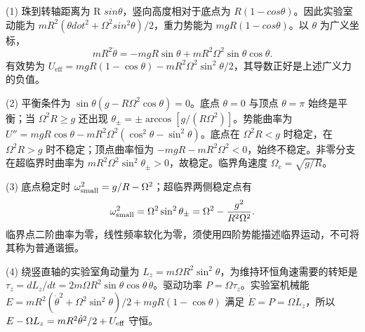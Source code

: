 (1) 珠到转轴距离为 R \(sin\theta \)，竖向高度相对于底点为 \(R(1-cos\theta )\)。因此实验室动能为 \(mR^{2}(\theta dot^{2}+\Omega ^{2}sin^{2}\theta )/2\)，重力势能为 \(mgR(1-cos\theta )\)。以 \(\theta \) 为广义坐标，
\[
mR^2\ddot\theta=-mgR\sin\theta+mR^2\Omega^2\sin\theta\cos\theta .
\]
有效势为 \(U_{\mathrm{eff}}=mgR(1-\cos\theta)-mR^2\Omega^2\sin^2\theta/2\)，其导数正好是上述广义力的负值。

(2) 平衡条件为 \(\sin\theta(g-R\Omega^2\cos\theta)=0\)。底点 \(\theta =0\) 与顶点 \(\theta =\pi \) 始终是平衡；当 \(\Omega^2R\ge g\) 还出现 \(\theta_\pm=\pm\arccos[g/(R\Omega^2)]\)。势能曲率为 \(U''=mgR\cos\theta-mR^2\Omega^2(\cos^2\theta-\sin^2\theta)\)。底点在 \(\Omega ^{2}R<g\) 时稳定，在 \(\Omega ^{2}R>g\) 时不稳定；顶点曲率恒为 \(-mgR-mR^2\Omega^2<0\)，始终不稳定。非零分支在超临界时曲率为 \(mR^2\Omega^2\sin^2\theta_\pm>0\)，故稳定。临界角速度 \(\Omega_c=\sqrt{g/R}\)。

(3) 底点稳定时 \(\omega_{\rm small}^2=g/R-\Omega^2\)；超临界两侧稳定点有
\[
\omega_{\rm small}^2=\Omega^2\sin^2\theta_\pm
=\Omega^2-\frac{g^2}{R^2\Omega^2}.
\]
临界点二阶曲率为零，线性频率软化为零，须使用四阶势能描述临界运动，不可将其称为普通谐振。

(4) 绕竖直轴的实验室角动量为 \(L_z=m\Omega R^2\sin^2\theta\)，为维持环恒角速需要的转矩是
\(\tau_z=dL_z/dt=2m\Omega R^2\sin\theta\cos\theta\,\dot\theta\)。驱动功率 \(P=\Omega\tau_z\)。实验室机械能 \(E=mR^2(\dot\theta^2+\Omega^2\sin^2\theta)/2+mgR(1-\cos\theta)\) 满足 \(\dot E=P=\Omega\dot L_z\)，所以 \(E-\Omega L_z=mR^2\dot\theta^2/2+U_{\rm eff}\) 守恒。
